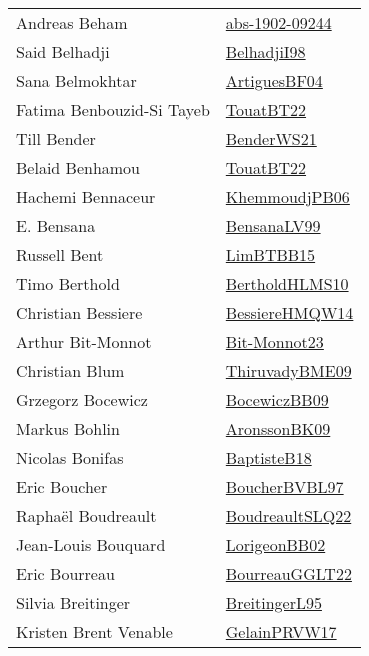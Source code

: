 {\begin{longtable}{p{4cm}p{20cm}}
Andreas Beham & \href{articles/abs-1902-09244.pdf}{abs-1902-09244}\cite{abs-1902-09244} \\
Said Belhadji & \href{articles/BelhadjiI98.pdf}{BelhadjiI98}\cite{BelhadjiI98} \\
Sana Belmokhtar & \href{papers/ArtiguesBF04.pdf}{ArtiguesBF04}\cite{ArtiguesBF04} \\
Fatima Benbouzid{-}Si Tayeb & \href{papers/TouatBT22.pdf}{TouatBT22}\cite{TouatBT22} \\
Till Bender & \href{papers/BenderWS21.pdf}{BenderWS21}\cite{BenderWS21} \\
Belaid Benhamou & \href{papers/TouatBT22.pdf}{TouatBT22}\cite{TouatBT22} \\
Hachemi Bennaceur & \href{papers/KhemmoudjPB06.pdf}{KhemmoudjPB06}\cite{KhemmoudjPB06} \\
E. Bensana & \href{articles/BensanaLV99.pdf}{BensanaLV99}\cite{BensanaLV99} \\
Russell Bent & \href{papers/LimBTBB15.pdf}{LimBTBB15}\cite{LimBTBB15} \\
Timo Berthold & \href{papers/BertholdHLMS10.pdf}{BertholdHLMS10}\cite{BertholdHLMS10} \\
Christian Bessiere & \href{papers/BessiereHMQW14.pdf}{BessiereHMQW14}\cite{BessiereHMQW14} \\
Arthur Bit{-}Monnot & \href{papers/Bit-Monnot23.pdf}{Bit-Monnot23}\cite{Bit-Monnot23} \\
Christian Blum & \href{papers/ThiruvadyBME09.pdf}{ThiruvadyBME09}\cite{ThiruvadyBME09} \\
Grzegorz Bocewicz & \href{}{BocewiczBB09}\cite{BocewiczBB09} \\
Markus Bohlin & \href{papers/AronssonBK09.pdf}{AronssonBK09}\cite{AronssonBK09} \\
Nicolas Bonifas & \href{articles/BaptisteB18.pdf}{BaptisteB18}\cite{BaptisteB18} \\
Eric Boucher & \href{}{BoucherBVBL97}\cite{BoucherBVBL97} \\
Rapha{\"{e}}l Boudreault & \href{papers/BoudreaultSLQ22.pdf}{BoudreaultSLQ22}\cite{BoudreaultSLQ22} \\
Jean{-}Louis Bouquard & \href{}{LorigeonBB02}\cite{LorigeonBB02} \\
Eric Bourreau & \href{articles/BourreauGGLT22.pdf}{BourreauGGLT22}\cite{BourreauGGLT22} \\
Silvia Breitinger & \href{}{BreitingerL95}\cite{BreitingerL95} \\
Kristen Brent Venable & \href{papers/GelainPRVW17.pdf}{GelainPRVW17}\cite{GelainPRVW17} \\

\end{longtable}}
